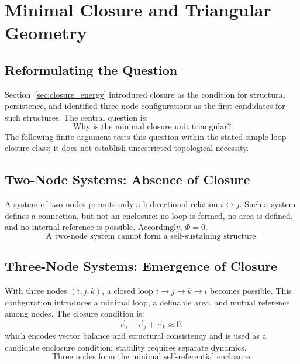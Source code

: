 \section{Minimal Closure and Triangular Geometry}
\label{sec:triangular}

\subsection{Reformulating the Question}

Section~\ref{sec:closure_energy} introduced closure as the condition
for structural persistence, and identified three-node configurations
as the first candidates for such structures.
The central question is:
\begin{equation}
  \boxed{\text{Why is the minimal closure unit triangular?}}
\end{equation}
The following finite argument tests this question within the stated simple-loop
closure class; it does not establish unrestricted topological necessity.

\subsection{Two-Node Systems: Absence of Closure}

A system of two nodes permits only a bidirectional relation $i \leftrightarrow j$.
Such a system defines a connection, but not an enclosure:
no loop is formed, no area is defined, and no internal reference is possible.
Accordingly, $\Phi = 0$.
\begin{equation}
  \boxed{\text{A two-node system cannot form a self-sustaining structure.}}
\end{equation}

\subsection{Three-Node Systems: Emergence of Closure}

With three nodes $(i,j,k)$, a closed loop $i \to j \to k \to i$ becomes possible.
This configuration introduces a minimal loop, a definable area,
and mutual reference among nodes.
The closure condition is:
\begin{equation}
  \vec{e}_i + \vec{e}_j + \vec{e}_k \approx 0,
\end{equation}
which encodes vector balance and structural consistency and is used as a
candidate enclosure condition; stability requires separate dynamics.
\begin{equation}
  \boxed{\text{Three nodes form the minimal self-referential enclosure.}}
\end{equation}

